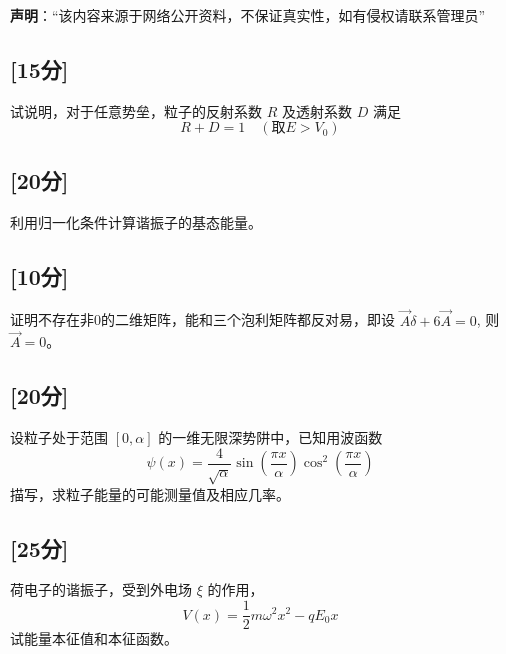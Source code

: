 
\textbf{声明}：“该内容来源于网络公开资料，不保证真实性，如有侵权请联系管理员”

\subsection{[15分]}
试说明，对于任意势垒，粒子的反射系数 $R$ 及透射系数 $D$ 满足
\[    R + D = 1 \quad (\text{取} E > V_0) ~ \]
\subsection{[20分]}
利用归一化条件计算谐振子的基态能量。
\subsection{[10分]}
证明不存在非0的二维矩阵，能和三个泡利矩阵都反对易，即设 $\vec A \delta + 6\vec A = 0$, 则 $\vec{A} = 0$。
\subsection{[20分]}
设粒子处于范围 $[0, \alpha]$ 的一维无限深势阱中，已知用波函数
    \[    \psi(x) = \frac{4}{\sqrt{\alpha}} \sin\left(\frac{\pi x}{\alpha}\right) \cos^2\left(\frac{\pi x}{\alpha}\right) ~ \]
    描写，求粒子能量的可能测量值及相应几率。
\subsection{[25分]}
荷电子的谐振子，受到外电场 $\xi$ 的作用，
    \[    V(x) = \frac{1}{2} m \omega^2 x^2 - q E_0 x  ~\]
 试能量本征值和本征函数。